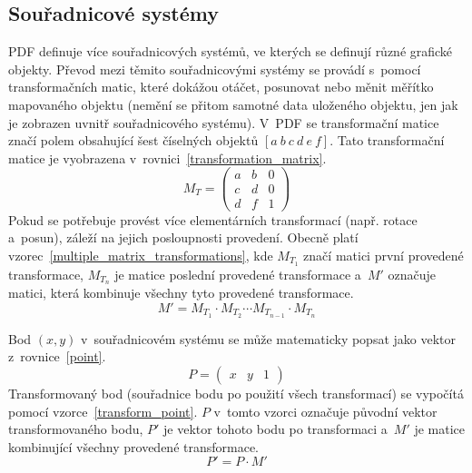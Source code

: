 \subsection*{Souřadnicové systémy}
PDF definuje více souřadnicových systémů, ve kterých se definují různé grafické
objekty. Převod mezi těmito souřadnicovými systémy se provádí s~pomocí
transformačních matic, které dokážou otáčet, posunovat nebo měnit měřítko
mapovaného objektu (nemění se přitom samotné data uloženého objektu, jen jak je
zobrazen uvnitř souřadnicového systému). V~PDF se transformační matice značí polem
obsahující šest číselných objektů $[a~b~c~d~e~f]$. Tato transformační matice je
vyobrazena v~rovnici~\eqref{transformation_matrix}.
\begin{equation}\label{transformation_matrix}
    M_T = 
    \begin{pmatrix}
        a & b & 0 \\
        c & d & 0 \\
        d & f & 1
    \end{pmatrix}
\end{equation}
Pokud se potřebuje provést více elementárních transformací 
(např. rotace a~posun), záleží na jejich posloupnosti provedení. Obecně
platí vzorec~\eqref{multiple_matrix_transformations}, kde $M_{T_1}$ značí matici
první provedené transformace, $M_{T_n}$ je matice poslední provedené transformace
a~$M'$ označuje matici, která kombinuje všechny tyto provedené transformace.
\begin{equation} \label{multiple_matrix_transformations}
    M' = M_{T_1} \cdot M_{T_2} \cdots M_{T_{n-1}} \cdot M_{T_n}
\end{equation}

Bod $(x, y)$ v~souřadnicovém systému se může matematicky popsat jako vektor
z~rovnice~\eqref{point}.
\begin{equation}\label{point}
    P = 
    \begin{pmatrix}
        x & y & 1
    \end{pmatrix}
\end{equation}
Transformovaný bod (souřadnice bodu po použití všech transformací) se vypočítá
pomocí vzorce~\eqref{transform_point}. $P$ v~tomto vzorci označuje původní vektor
transformovaného bodu, $P'$ je vektor tohoto bodu po transformaci a~$M'$ je matice
kombinující všechny provedené transformace.
\begin{equation} \label{transform_point}
    P' = P \cdot M'
\end{equation}

